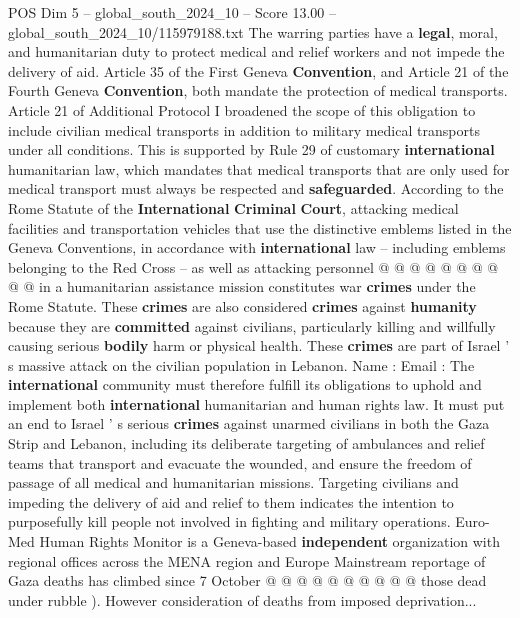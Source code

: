 \begin{textsample}{POS Dim 5 – global\_south\_2024\_10 – Score 13.00 – global\_south\_2024\_10/115979188.txt}
The warring parties have a \textbf{legal}, moral, and humanitarian duty to protect medical and relief workers and not impede the delivery of aid.
Article 35 of the First Geneva \textbf{Convention}, and Article 21 of the Fourth Geneva \textbf{Convention}, both mandate the protection of medical transports.
Article 21 of Additional Protocol I broadened the scope of this obligation to include civilian medical transports in addition to military medical transports under all conditions.
This is supported by Rule 29 of customary \textbf{international} humanitarian law, which mandates that medical transports that are only used for medical transport must always be respected and \textbf{safeguarded}.
According to the Rome Statute of the \textbf{International} \textbf{Criminal} \textbf{Court}, attacking medical facilities and transportation vehicles that use the distinctive emblems listed in the Geneva Conventions, in accordance with \textbf{international} law -- including emblems belonging to the Red Cross -- as well as attacking personnel @ @ @ @ @ @ @ @ @ @ in a humanitarian assistance mission constitutes war \textbf{crimes} under the Rome Statute.
These \textbf{crimes} are also considered \textbf{crimes} against \textbf{humanity} because they are \textbf{committed} against civilians, particularly killing and willfully causing serious \textbf{bodily} harm or physical health.
These \textbf{crimes} are part of Israel ' s massive attack on the civilian population in Lebanon.
Name : Email : The \textbf{international} community must therefore fulfill its obligations to uphold and implement both \textbf{international} humanitarian and human rights law.
It must put an end to Israel ' s serious \textbf{crimes} against unarmed civilians in both the Gaza Strip and Lebanon, including its deliberate targeting of ambulances and relief teams that transport and evacuate the wounded, and ensure the freedom of passage of all medical and humanitarian missions.
Targeting civilians and impeding the delivery of aid and relief to them indicates the intention to purposefully kill people not involved in fighting and military operations.
Euro-Med Human Rights Monitor is a Geneva-based \textbf{independent} organization with regional offices across the MENA region and Europe Mainstream reportage of Gaza deaths has climbed since 7 October @ @ @ @ @ @ @ @ @ @ those dead under rubble ).
However consideration of deaths from imposed deprivation...

\end{textsample}
